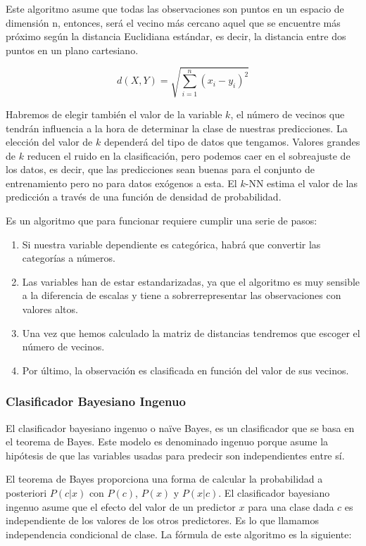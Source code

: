 \documentclass[11pt,a4paper,spanish]{article} %
\begin{document}
Este algoritmo asume que todas las observaciones son puntos en un espacio de dimensión n, entonces, será el vecino más cercano aquel que se encuentre más próximo según la distancia Euclidiana estándar, es decir, la distancia entre dos puntos en un plano cartesiano.

$$d(X,Y) = \sqrt{\sum_{i=1}^n(x_i - y_i)^2}$$

Habremos de elegir también el valor de la variable $k$,  el número de vecinos que tendrán influencia a la hora de determinar la clase de nuestras predicciones. La elección del valor de $k$ dependerá del tipo de datos que tengamos. Valores grandes de $k$ reducen el ruido en la clasificación, pero podemos caer en el sobreajuste de los datos, es decir, que las predicciones sean buenas para el conjunto de entrenamiento pero no para datos exógenos a esta. El $k$-NN estima el valor de las predicción a través de una función de densidad de probabilidad.

Es un algoritmo que para funcionar requiere cumplir una serie de pasos:

\begin{enumerate}
	\item{Si nuestra variable dependiente es categórica, habrá que convertir las categorías a números.}
	
	\item{Las variables han de estar estandarizadas, ya que el algoritmo es muy sensible a la diferencia de escalas y tiene a sobrerrepresentar las observaciones con valores altos.}
	
	\item{Una vez que hemos calculado la matriz de distancias tendremos que escoger el número de vecinos.}
	
	\item{Por último, la observación es clasificada en función del valor de sus vecinos.}
\end{enumerate}



\subsubsection{Clasificador Bayesiano Ingenuo}
El clasificador bayesiano ingenuo o naïve Bayes, es un clasificador que se basa en el teorema de Bayes. Este modelo es denominado ingenuo porque asume la hipótesis de que las variables usadas para predecir son independientes entre sí.

El teorema de Bayes proporciona una forma de calcular la probabilidad a posteriori $P(c|x)$ con $P(c)$, $P(x)$ y $P(x|c)$. El clasificador bayesiano ingenuo asume que el efecto del valor de un predictor $x$ para una clase dada $c$ es independiente de los valores de los otros predictores. Es lo que llamamos independencia condicional de clase. La fórmula de este algoritmo es la siguiente:
\end{document}
